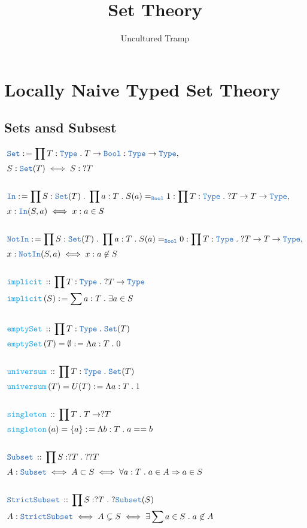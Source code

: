 \documentclass[12pt]{scrartcl}
\author{Uncultured Tramp}
\title{Set Theory}
\newcommand{\TYPE}[1]{\textcolor{NavyBlue}{\mathtt{#1}}}
\newcommand{\FUNC}[1]{\textcolor{Cerulean}{\mathtt{#1}}}
\renewcommand{\.}{\; . \;}
\newcommand{\de}{: \kern 0.1pc =}
\newcommand{\Act}[1]{\left( #1 \right)}
\newcommand{\DeclareType}[2]{& \TYPE{#1} \, :: \, #2 \\}
\newcommand{\DefineNamedType}[4]{& #1 : \TYPE{#2} \iff #3 \iff #4 \\}
\newcommand{\DeclareFunc}[2]{& \FUNC{#1} \, :: \, #2 \\}
\newcommand{\DefineFunc}[3]{&  \FUNC{#1}\Act{#2} \de #3 \\}
\newcommand{\DefineNamedFunc}[4]{&  \FUNC{#1}\Act{#2} = #3 \de #4 \\}
\newcommand{\Page}[1]{ \begin{align*} #1 \end{align*}   }
\newcommand{\Type}{\TYPE{Type}}
\newcommand{\Set}{\TYPE{Set}}
\newcommand{\Say}[3]{& #1 \de #2 : #3, \\}
\begin{document}
\maketitle
\newpage
\tableofcontents
\newpage
\section{Locally Naive Typed Set Theory}
\subsection{Sets ansd Subsest}
\Page{
	\Say{\Set}{\prod T : \Type \. T \to \TYPE{Bool} }{ \Type \to \Type  }
	& S : \Set(T) \iff S : \; ?T  \\
	\\
	\Say{\TYPE{In}}{\prod S : \Set(T) \. \prod a : T \. S(a) =_{\TYPE{Bool}} 1 }
	{ \prod T : \Type \.  ?T \to T \to \Type } 
	& x : \TYPE{In}(S,a) \iff x : a \in S \\
	\\
	\Say{\TYPE{NotIn}}{\prod S : \Set(T) \. \prod a : T \. S(a) =_{\TYPE{Bool}} 0}
	{\prod T : \Type \. ?T \to T \to \Type }
	&  x : \TYPE{NotIn}(S,a) \iff x : a \not \in S\\
	\\
	\DeclareFunc{implicit}{\prod T : \Type \. ?T \to \Type}
	\DefineFunc{implicit}{S}{ \sum a : T \. \exists a \in S}
	\\
	\DeclareFunc{emptySet}{ \prod  T : \Type \. \Set(T) }
	\DefineNamedFunc{emptySet}{T}{\emptyset}{\Lambda a : T \. 0}
	\\
	\DeclareFunc{universum}{\prod T : \Type \. \Set(T)}
	\DefineNamedFunc{universum}{T}{U(T)}{ \Lambda a :  T \. 1}
	\\
	\DeclareFunc{singleton}{\prod T \. T \to ?T}
	\DefineNamedFunc{singleton}{a}{\{a\}}{\Lambda b : T \. a == b}
	\\
	\DeclareType{Subset}{\prod S : ?T \. ??T}
	\DefineNamedType{A}{Subset}{A \subset S }{ \forall a : T \. a \in A \Rightarrow a \in S}
	\\
	\DeclareType{StrictSubset}{\prod S : ?T \. ?\TYPE{Subset}(S)}
	\DefineNamedType{A}{StrictSubset}{A \subsetneq S}
	{ \exists  \sum a \in S \.  a \not \in A }
}
\end{document}
